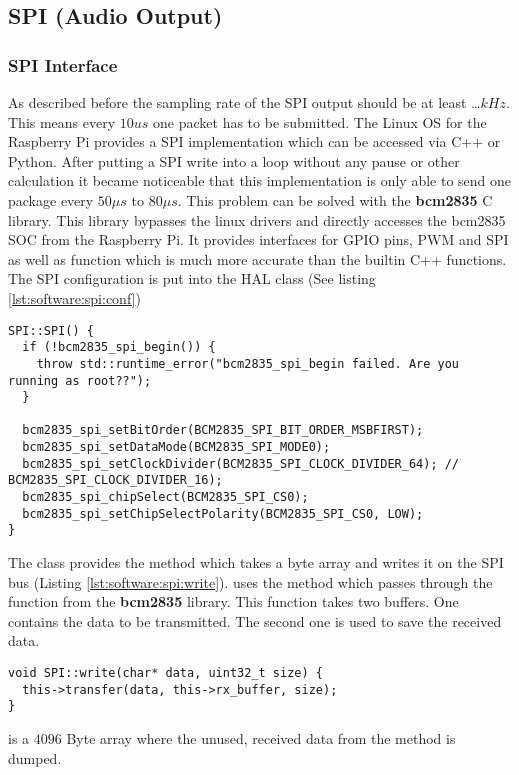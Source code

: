 \subsection{SPI (Audio Output)}

\subsubsection*{SPI Interface}

As described before the sampling rate of the SPI output should be at least \dots$kHz$. This means every $10us$ one packet has to be submitted. The Linux OS for the Raspberry Pi provides a SPI implementation which can be accessed via C++ or Python. After putting a SPI write into a loop without any pause or other calculation it became noticeable that this implementation is only able to send one package every $50\mu s$ to $80\mu s$. This problem can be solved with the \textbf{bcm2835} C library.\cite{mccauley_bcm2835_nodate} This library bypasses the linux drivers and directly accesses the bcm2835 SOC from the Raspberry Pi. It provides interfaces for GPIO pins, PWM and SPI as well as  function which is much more accurate than the builtin C++ functions.\p
%
The SPI configuration is put into the HAL class  (See listing \ref{lst:software:spi:conf})
%
\begin{mdframed}
\begin{lstlisting}[caption=SPI configuration, label=lst:software:spi:conf]
SPI::SPI() {
  if (!bcm2835_spi_begin()) {
    throw std::runtime_error("bcm2835_spi_begin failed. Are you running as root??");
  }

  bcm2835_spi_setBitOrder(BCM2835_SPI_BIT_ORDER_MSBFIRST);
  bcm2835_spi_setDataMode(BCM2835_SPI_MODE0);
  bcm2835_spi_setClockDivider(BCM2835_SPI_CLOCK_DIVIDER_64); // BCM2835_SPI_CLOCK_DIVIDER_16);
  bcm2835_spi_chipSelect(BCM2835_SPI_CS0);
  bcm2835_spi_setChipSelectPolarity(BCM2835_SPI_CS0, LOW);
}
\end{lstlisting}
\end{mdframed}
%
The  class provides the method  which takes a byte array and writes it on the SPI bus (Listing \ref{lst:software:spi:write}).  uses the method  which passes through the function  from the \textbf{bcm2835} library. This function takes two buffers. One contains the data to be transmitted. The second one is used to save the received data.
%
\begin{mdframed}
\begin{lstlisting}[caption=Method for writing data onto the SPI bus, label=lst:software:spi:write]
void SPI::write(char* data, uint32_t size) {
  this->transfer(data, this->rx_buffer, size);
}
\end{lstlisting}
\end{mdframed}
%
 is a $4096$ Byte array where the unused, received data from the  method is dumped.
%
